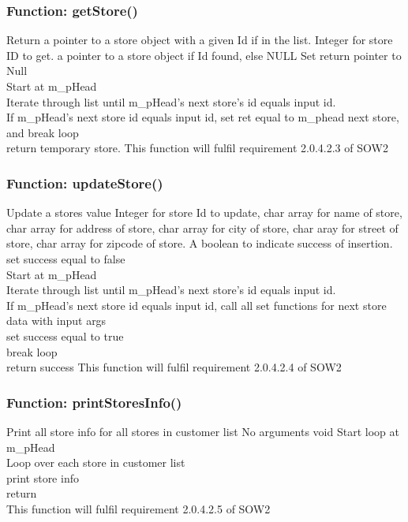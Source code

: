 \documentclass[12pt]{article}%
\newcounter{subsubsubsection}[subsubsection]
\begin{document}
\subsubsection{Function: getStore()}
Return a pointer to a store object with a given Id if in the list.
Integer for store ID to get.
a pointer to a store object if Id found, else NULL
Set return pointer to Null \\
Start at m\_pHead \\
Iterate through list until m\_pHead's next store's id equals input id. \\
If m\_pHead's next store id equals input id, set ret equal to m\_phead next store, and break loop \\
return temporary store.
This function will fulfil requirement 2.0.4.2.3 of SOW2

\subsubsection{Function: updateStore()}
Update a stores value
Integer for store Id to update, char array for name of store, char array for address of store,
char array for city of store, char aray for street of store, char array for zipcode of store.
A boolean to indicate success of insertion.
set success equal to false \\
Start at m\_pHead \\
Iterate through list until m\_pHead's next store's id equals input id. \\
\quad If m\_pHead's next store id equals input id, call all set functions for next store data with input args \\
\quad \quad set success equal to true \\
\quad \quad break loop \\
return success
This function will fulfil requirement 2.0.4.2.4 of SOW2

\subsubsection{Function: printStoresInfo()}
Print all store info for all stores in customer list
No arguments
void
Start loop at m\_pHead \\
Loop over each store in customer list \\
\tab print store info \\
return\\
This function will fulfil requirement 2.0.4.2.5 of SOW2
\end{document}
